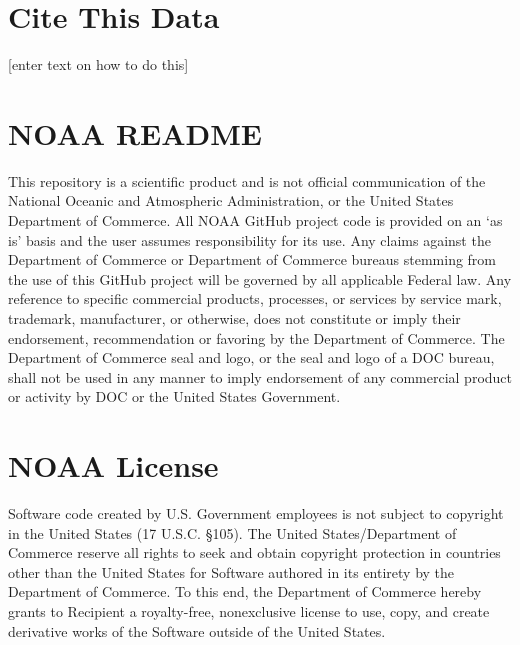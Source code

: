 \documentclass[
  letterpaper,
  oneside,
  open=any]{scrbook}
\begin{document}
\section*{Cite This Data}\label{cite-this-data}


{[}enter text on how to do this{]}

\section*{NOAA README}\label{noaa-readme}


This repository is a scientific product and is not official
communication of the National Oceanic and Atmospheric Administration, or
the United States Department of Commerce. All NOAA GitHub project code
is provided on an `as is' basis and the user assumes responsibility for
its use. Any claims against the Department of Commerce or Department of
Commerce bureaus stemming from the use of this GitHub project will be
governed by all applicable Federal law. Any reference to specific
commercial products, processes, or services by service mark, trademark,
manufacturer, or otherwise, does not constitute or imply their
endorsement, recommendation or favoring by the Department of Commerce.
The Department of Commerce seal and logo, or the seal and logo of a DOC
bureau, shall not be used in any manner to imply endorsement of any
commercial product or activity by DOC or the United States Government.

\section*{NOAA License}\label{noaa-license}


Software code created by U.S. Government employees is not subject to
copyright in the United States (17 U.S.C. §105). The United
States/Department of Commerce reserve all rights to seek and obtain
copyright protection in countries other than the United States for
Software authored in its entirety by the Department of Commerce. To this
end, the Department of Commerce hereby grants to Recipient a
royalty-free, nonexclusive license to use, copy, and create derivative
works of the Software outside of the United States.
\end{document}
